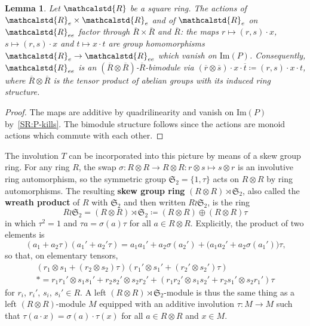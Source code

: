\documentclass[reqno,a4paper]{amsart}
\theoremstyle{plain}
\newtheorem{lemma}[subsection]{Lemma}
\theoremstyle{definition}
\newcommand{\defn}{\textbf}
\newcommand{\DefEq}{\coloneq}
\newcommand{\R}{\ensuremath{\mathcalstd{R}}}
\renewcommand{\Im}{\ensuremath{\mathrm{Im}}}
\renewcommand{\Re}{\ensuremath{\R_{e}}}
\newcommand{\Ree}{\ensuremath{\R_{ee}}}
\newcommand{\Rbar}{\ensuremath{\overline{R}}}
\begin{document}
\begin{lemma}\label{lem:actions-factor}
  Let \(\R\) be a square ring. The actions of \(\Re\times\Re\) and of \(\Re\) on \(\Ree\) factor through \(\Rbar\times\Rbar\) and \(\Rbar\): the maps \(r\mapsto(r,s)\cdot x\), \(s\mapsto(r,s)\cdot x\) and \(t\mapsto x\cdot t\) are group homomorphisms \(\Re\to\Ree\) which vanish on \(\Im(P)\). Consequently, \(\Ree\) is an \((\Rbar\otimes\Rbar)\)-\(\Rbar\)-bimodule via \((\overline{r}\otimes\overline{s})\cdot x\cdot\overline{t}\DefEq(r,s)\cdot x\cdot t\), where \(\Rbar\otimes\Rbar\) is the tensor product of abelian groups with its induced ring structure.
\end{lemma}

\begin{proof}
  The maps are additive by quadrilinearity and vanish on \(\Im(P)\) by~\ref{SR:P-kills}. The bimodule structure follows since the actions are monoid actions which commute with each other.
\end{proof}

The involution \(T\) can be incorporated into this picture by means of a skew group ring. For any ring \(R\), the swap \(\sigma\colon R\otimes R\to R\otimes R\colon r\otimes s\mapsto s\otimes r\) is an involutive ring automorphism, so the symmetric group \(\mathfrak{S}_2=\{1,\tau\}\) acts on \(R\otimes R\) by ring automorphisms. The resulting \defn{skew group ring} \((R\otimes R)\rtimes\mathfrak{S}_2\), also called the \defn{wreath product} of \(R\) with \(\mathfrak{S}_2\) and then written \(R\wr\mathfrak{S}_2\), is the ring
\[
  R\wr\mathfrak{S}_2=(R\otimes R)\rtimes\mathfrak{S}_2\DefEq(R\otimes R)\oplus(R\otimes R)\tau
\]
in which \(\tau^2=1\) and \(\tau a=\sigma(a)\tau\) for all \(a\in R\otimes R\). Explicitly, the product of two elements is
\[
  (a_1+a_2\tau)(a_1'+a_2'\tau)=a_1a_1'+a_2\sigma(a_2')+\bigl(a_1a_2'+a_2\sigma(a_1')\bigr)\tau\text{,}
\]
so that, on elementary tensors,
\begin{multline*}
  (r_1\otimes s_1+(r_2\otimes s_2)\tau)(r_1'\otimes s_1'+(r_2'\otimes s_2')\tau)\\*
  =r_1r_1'\otimes s_1s_1'+r_2s_2'\otimes s_2r_2'+(r_1r_2'\otimes s_1s_2'+r_2s_1'\otimes s_2r_1')\tau
\end{multline*}
for \(r_i\), \(r_i'\), \(s_i\), \(s_i'\in R\). A left \((R\otimes R)\rtimes\mathfrak{S}_2\)-module is thus the same thing as a left \((R\otimes R)\)-module \(M\) equipped with an additive involution \(\tau\colon M\to M\) such that \(\tau(a\cdot x)=\sigma(a)\cdot\tau(x)\) for all \(a\in R\otimes R\) and \(x\in M\).
\end{document}
